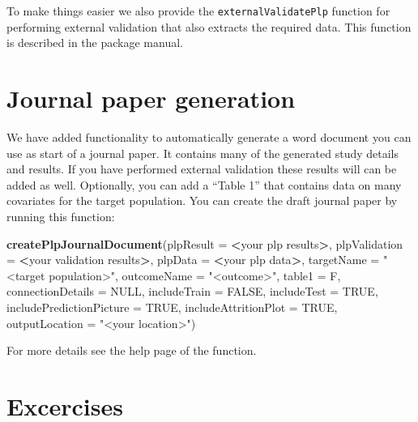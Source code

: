 \documentclass[11pt]{book}
\newenvironment{Shaded}{\begin{snugshade}}{\end{snugshade}}
\newcommand{\KeywordTok}[1]{\textcolor[rgb]{0.13,0.29,0.53}{\textbf{#1}}}
\newcommand{\DataTypeTok}[1]{\textcolor[rgb]{0.13,0.29,0.53}{#1}}
\newcommand{\StringTok}[1]{\textcolor[rgb]{0.31,0.60,0.02}{#1}}
\newcommand{\OtherTok}[1]{\textcolor[rgb]{0.56,0.35,0.01}{#1}}
\newcommand{\OperatorTok}[1]{\textcolor[rgb]{0.81,0.36,0.00}{\textbf{#1}}}
\newcommand{\NormalTok}[1]{#1}
\begin{document}
To make things easier we also provide the \texttt{externalValidatePlp}
function for performing external validation that also extracts the
required data. This function is described in the package manual.

\section{Journal paper generation}\label{journal-paper-generation}

We have added functionality to automatically generate a word document
you can use as start of a journal paper. It contains many of the
generated study details and results. If you have performed external
validation these results will can be added as well. Optionally, you can
add a ``Table 1'' that contains data on many covariates for the target
population. You can create the draft journal paper by running this
function:

\begin{Shaded}
\begin{Highlighting}[]
 \KeywordTok{createPlpJournalDocument}\NormalTok{(}\DataTypeTok{plpResult =} \OperatorTok{<}\NormalTok{your plp results}\OperatorTok{>}\NormalTok{,}
                          \DataTypeTok{plpValidation =} \OperatorTok{<}\NormalTok{your validation results}\OperatorTok{>}\NormalTok{,}
                          \DataTypeTok{plpData =} \OperatorTok{<}\NormalTok{your plp data}\OperatorTok{>}\NormalTok{,}
                          \DataTypeTok{targetName =} \StringTok{"<target population>"}\NormalTok{,}
                          \DataTypeTok{outcomeName =} \StringTok{"<outcome>"}\NormalTok{,}
                          \DataTypeTok{table1 =}\NormalTok{ F,}
                          \DataTypeTok{connectionDetails =} \OtherTok{NULL}\NormalTok{,}
                          \DataTypeTok{includeTrain =} \OtherTok{FALSE}\NormalTok{,}
                          \DataTypeTok{includeTest =} \OtherTok{TRUE}\NormalTok{,}
                          \DataTypeTok{includePredictionPicture =} \OtherTok{TRUE}\NormalTok{,}
                          \DataTypeTok{includeAttritionPlot =} \OtherTok{TRUE}\NormalTok{,}
                          \DataTypeTok{outputLocation =} \StringTok{"<your location>"}\NormalTok{)}
\end{Highlighting}
\end{Shaded}

For more details see the help page of the function.

\section{Excercises}\label{excercises-1}
\end{document}
